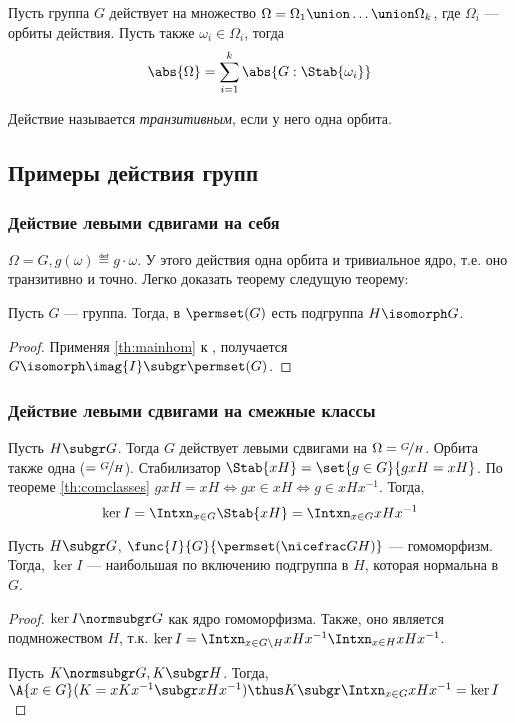 \begin{corollary}
  Пусть группа $G$ действует на множество $\Omega=\Omega_1\union\dots\union\Omega_k$, где $\Omega_i$ --- орбиты действия. Пусть также $\omega_i\in \Omega_i$, тогда
  \[\abs{\Omega}=\sum_{i=1}^k{\abs{G:\Stab{\omega_i}}}\]
\end{corollary}

\begin{definition}
  Действие называется \emph{транзитивным}, если у него одна орбита.
\end{definition}

\subsection{Примеры действия групп}
\subsubsection{Действие левыми сдвигами на себя}
$\Omega=G, g(\omega)\eqdef g\cdot\omega$. У этого действия одна орбита и тривиальное ядро, т.\:е. оно транзитивно и точно. Легко доказать теорему следущую теорему:
\begin{theorem}\label{th:cayley}
  Пусть $G$ --- группа. Тогда, в $\permset(G)$ есть подгруппа $H\isomorph G$.
\end{theorem}
\begin{proof}
  Применяя \ref{th:mainhom} к , получается $G\isomorph \imag{I}\subgr \permset(G)$.
\end{proof}

\subsubsection{Действие левыми сдвигами на смежные классы}
Пусть $H\subgr G$. Тогда $G$ действует левыми сдвигами на $\Omega=\factorgr{G}{H}$. Орбита также одна ($=\factorgr{G}{H}$). Стабилизатор $\Stab{xH}=\set{g\in G}{gxH=xH}$. По теореме \ref{th:comclasses} $gxH=xH\iff gx\in xH \iff g\in xHx^{-1}$. Тогда,
\[\ker{I}=\Intxn_{x\in G}{\Stab{xH}}=\Intxn_{x\in G}{xHx^{-1}}\]
\begin{theorem}
  Пусть $H\subgr G$, $\func{I}{G}{\permset(\factorgr{G}{H})}$ --- гомоморфизм. Тогда, $\ker{I}$ --- наибольшая по включению подгруппа в $H$, которая нормальна в $G$.
\end{theorem}
\begin{proof}
  $\ker{I}\normsubgr G$ как ядро гомоморфизма. Также, оно является подмножеством $H$, т.\:к. $\ker{I}=\Intxn_{x\in G\setminus H}{xHx^{-1}}\Intxn_{x\in H}{xHx^{-1}}$.

  Пусть $K\normsubgr G, K\subgr H$. Тогда, $\A{x\in G}(K=xKx^{-1}\subgr xHx^{-1}) \thus K\subgr \Intxn_{x\in G}{xHx^{-1}}=\ker{I}$
\end{proof}

